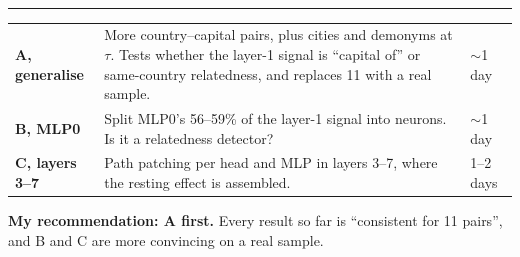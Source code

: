 \documentclass[10pt]{article}
\newcommand{\head}[1]{\par\vspace{5pt}{\large\bfseries #1}\\[-4pt]\rule{\linewidth}{0.5pt}\par}
\begin{document}
\head{Next-step options to put to him}
{\small
\begin{tabularx}{\linewidth}{@{}l X l@{}}
\textbf{A, generalise} & More country--capital pairs, plus cities and demonyms at $\tau$. Tests whether the layer-1 signal is ``capital of'' or same-country relatedness, and replaces 11 with a real sample. & $\sim$1 day \\
\textbf{B, MLP0} & Split MLP0's 56--59\% of the layer-1 signal into neurons. Is it a relatedness detector? & $\sim$1 day \\
\textbf{C, layers 3--7} & Path patching per head and MLP in layers 3--7, where the resting effect is assembled. & 1--2 days \\
\end{tabularx}
\textbf{My recommendation: A first.} Every result so far is ``consistent for 11 pairs'', and B and C are more
convincing on a real sample.}
\end{document}
